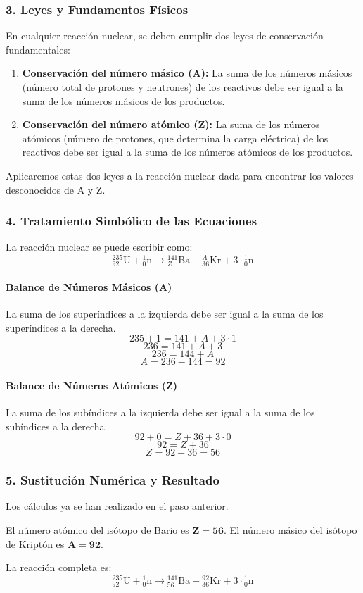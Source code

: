 \subsubsection*{3. Leyes y Fundamentos Físicos}
En cualquier reacción nuclear, se deben cumplir dos leyes de conservación fundamentales:
\begin{enumerate}
    \item \textbf{Conservación del número másico (A):} La suma de los números másicos (número total de protones y neutrones) de los reactivos debe ser igual a la suma de los números másicos de los productos.
    \item \textbf{Conservación del número atómico (Z):} La suma de los números atómicos (número de protones, que determina la carga eléctrica) de los reactivos debe ser igual a la suma de los números atómicos de los productos.
\end{enumerate}
Aplicaremos estas dos leyes a la reacción nuclear dada para encontrar los valores desconocidos de A y Z.

\subsubsection*{4. Tratamiento Simbólico de las Ecuaciones}
La reacción nuclear se puede escribir como:
$${}_{92}^{235}\text{U} + {}_{0}^{1}\text{n} \longrightarrow {}_{Z}^{141}\text{Ba} + {}_{36}^{A}\text{Kr} + 3 \cdot {}_{0}^{1}\text{n}$$

\paragraph*{Balance de Números Másicos (A)}
La suma de los superíndices a la izquierda debe ser igual a la suma de los superíndices a la derecha.
$$235 + 1 = 141 + A + 3 \cdot 1$$
$$236 = 141 + A + 3$$
$$236 = 144 + A$$
$$A = 236 - 144 = 92$$

\paragraph*{Balance de Números Atómicos (Z)}
La suma de los subíndices a la izquierda debe ser igual a la suma de los subíndices a la derecha.
$$92 + 0 = Z + 36 + 3 \cdot 0$$
$$92 = Z + 36$$
$$Z = 92 - 36 = 56$$

\subsubsection*{5. Sustitución Numérica y Resultado}
Los cálculos ya se han realizado en el paso anterior.
\begin{cajaresultado}
El número atómico del isótopo de Bario es $\boldsymbol{Z=56}$.
El número másico del isótopo de Kriptón es $\boldsymbol{A=92}$.
\end{cajaresultado}
La reacción completa es:
$${}_{92}^{235}\text{U} + {}_{0}^{1}\text{n} \longrightarrow {}_{56}^{141}\text{Ba} + {}_{36}^{92}\text{Kr} + 3 \cdot {}_{0}^{1}\text{n}$$

